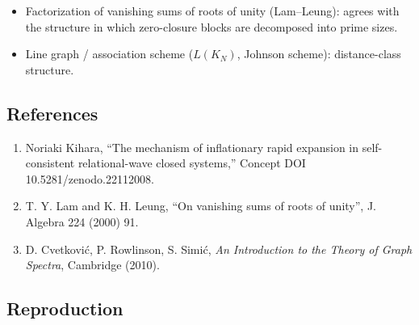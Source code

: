 \documentclass[
  a4paper,
]{ltjsarticle}
\providecommand{\tightlist}{%
  \setlength{\itemsep}{0pt}\setlength{\parskip}{0pt}}
\begin{document}
\begin{itemize}
\tightlist
\item
  Factorization of vanishing sums of roots of unity (Lam--Leung): agrees
  with the structure in which zero-closure blocks are decomposed into
  prime sizes.
\item
  Line graph / association scheme (\(L(K_N)\), Johnson scheme):
  distance-class structure.
\end{itemize}

\subsection{References}\label{references}

\begin{enumerate}
\def\labelenumi{\arabic{enumi}.}
\tightlist
\item
  Noriaki Kihara, ``The mechanism of inflationary rapid expansion in
  self-consistent relational-wave closed systems,'' Concept DOI
  10.5281/zenodo.22112008.
\item
  T. Y. Lam and K. H. Leung, ``On vanishing sums of roots of unity'', J.
  Algebra 224 (2000) 91.
\item
  D. Cvetković, P. Rowlinson, S. Simić, \emph{An Introduction to the
  Theory of Graph Spectra}, Cambridge (2010).
\end{enumerate}

\subsection{Reproduction}\label{reproduction}
\end{document}
